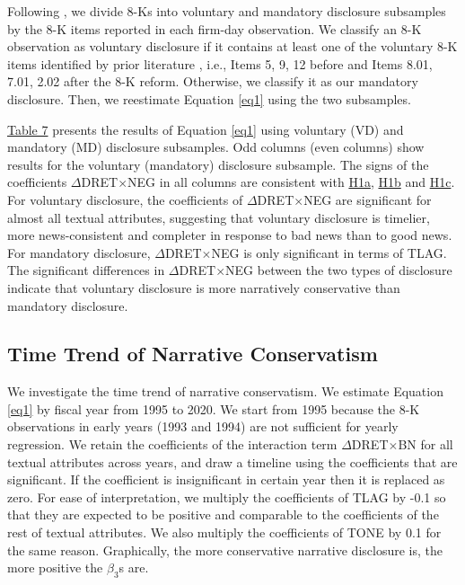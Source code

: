 \documentclass[letterpaper,12pt]{article}
\begin{document}
\begin{spacing}{1.5}
Following , we divide 8-Ks into voluntary and mandatory disclosure subsamples by the 8-K items reported in each firm-day observation. We classify an 8-K observation as voluntary disclosure if it contains at least one of the voluntary 8-K items identified by prior literature \cite{lermanNewForm8K2010, heMeasuringDisclosureUsing2020}, i.e., Items 5, 9, 12 before and Items 8.01, 7.01, 2.02 after the 8-K reform. Otherwise, we classify it as our mandatory disclosure. Then, we reestimate Equation \eqref{eq1} using the two subsamples. 

\hyperref[T7]{Table 7} presents the results of Equation \eqref{eq1} using voluntary (VD) and mandatory (MD) disclosure subsamples. Odd columns (even columns) show results for the voluntary (mandatory) disclosure subsample. The signs of the coefficients $\Delta$DRET$\times$NEG in all columns are consistent with \hyperref[hyp:h1a]{H1a}, \hyperref[hyp:h1b]{H1b} and \hyperref[hyp:h1c]{H1c}. For voluntary disclosure, the coefficients of $\Delta$DRET$\times$NEG are significant for almost all textual attributes, suggesting that voluntary disclosure is timelier, more news-consistent and completer in response to bad news than to good news. For mandatory disclosure, $\Delta$DRET$\times$NEG is only significant in terms of TLAG. The significant differences in $\Delta$DRET$\times$NEG between the two types of disclosure indicate that voluntary disclosure is more narratively conservative than mandatory disclosure.

\subsection{Time Trend of Narrative Conservatism}
\noindent We investigate the time trend of narrative conservatism. We estimate Equation \eqref{eq1} by fiscal year from 1995 to 2020. We start from 1995 because the 8-K observations in early years (1993 and 1994) are not sufficient for yearly regression. We retain the coefficients of the interaction term $\Delta$DRET$\times$BN for all textual attributes across years, and draw a timeline using the coefficients that are significant. If the coefficient is insignificant in certain year then it is replaced as zero. For ease of interpretation, we multiply the coefficients of TLAG by -0.1 so that they are expected to be positive and comparable to the coefficients of the rest of textual attributes. We also multiply the coefficients of TONE by 0.1 for the same reason. Graphically, the more conservative narrative disclosure is, the more positive the $\beta_3$s are.


\end{spacing}
\end{document}
